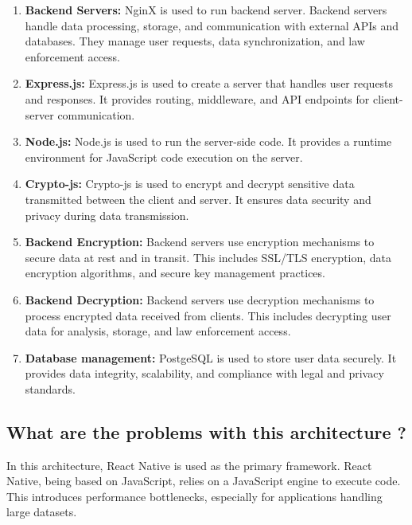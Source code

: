 \begin{enumerate}[label=\roman*.]

    \item \textbf{Backend Servers:} NginX is used to run backend server.
    Backend servers handle data processing, storage, and communication with external APIs and databases.
    They manage user requests, data synchronization, and law enforcement access.
    
    \item \textbf{Express.js:} Express.js is used to create a server that handles user requests and responses.
    It provides routing, middleware, and API endpoints for client-server communication.
    \item \textbf{Node.js:} Node.js is used to run the server-side code.
    It provides a runtime environment for JavaScript code execution on the server.
    \item \textbf{Crypto-js:} Crypto-js is used to encrypt and decrypt sensitive data transmitted between the client and server.
    It ensures data security and privacy during data transmission.
    \item \textbf{Backend Encryption:} Backend servers use encryption mechanisms to secure data at rest and in transit.
    This includes SSL/TLS encryption, data encryption algorithms, and secure key management practices.
    \item \textbf{Backend Decryption:} Backend servers use decryption mechanisms to process encrypted data received from clients.
    This includes decrypting user data for analysis, storage, and law enforcement access.
    \item \textbf{Database management:} PostgeSQL is used to store user data securely.
    It provides data integrity, scalability, and compliance with legal and privacy standards.
\end{enumerate}

\subsection{What are the problems with this architecture ?}\label{subsec:what-are-the-problems-with-this-archetecture}

In this architecture, React Native is used as the primary framework.
React Native, being based on JavaScript, relies on a JavaScript engine to execute code.
This introduces performance bottlenecks, especially for applications handling large datasets.

